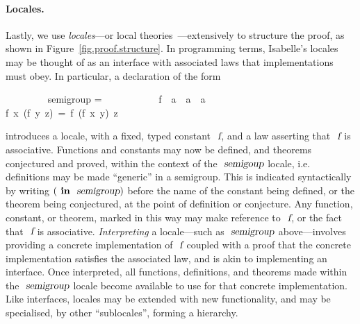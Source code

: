 \paragraph{Locales.}

Lastly, we use \emph{locales}---or local theories~\cite{DBLP:conf/tphol/KammullerWP99,DBLP:conf/types/HaftmannW08}---extensively to structure the proof, as shown in Figure~\ref{fig.proof.structure}.
In programming terms, Isabelle's locales may be thought of as an interface with associated laws that implementations must obey.
In particular, a declaration of the form
\vspace{0.25em}
\begin{isabellebody}
\ \ \ \ \ \ \ \  semigroup = \isanewline
\ \ \ \ \ \ \ \ \ \ \ f\ {\isacharcolon}{\isacharcolon}\ {\isachardoublequoteopen}{\isacharprime}a\ {\isasymRightarrow}\ {\isacharprime}a{\isachardoublequoteclose}\ {\isasymRightarrow}\ {\isacharprime}a{\isachardoublequoteclose} \isanewline
\ \ \ \ \ \ \ \ \ \  {\isachardoublequoteopen}f\ x\ (f\ y\ z)\ =\ f\ (f\ x\ y)\ z{\isachardoublequoteclose}
\end{isabellebody}
\vspace{0.25em}
\noindent
introduces a locale, with a fixed, typed constant $\isa{f}$, and a law asserting that $\isa{f}$ is associative.
Functions and constants may now be defined, and theorems conjectured and proved, within the context of the $\isa{semigoup}$ locale, i.e. definitions may be made ``generic'' in a semigroup.
This is indicated syntactically by writing $(\isacommand{in}\ \isa{semigroup})$ before the name of the constant being defined, or the theorem being conjectured, at the point of definition or conjecture.
Any function, constant, or theorem, marked in this way may make reference to $\isa{f}$, or the fact that $\isa{f}$ is associative.
\emph{Interpreting} a locale---such as $\isa{semigroup}$ above---involves providing a concrete implementation of $\isa{f}$ coupled with a proof that the concrete implementation satisfies the associated law, and is akin to implementing an interface.
Once interpreted, all functions, definitions, and theorems made within the $\isa{semigroup}$ locale become available to use for that concrete implementation.
Like interfaces, locales may be extended with new functionality, and may be specialised, by other ``sublocales'', forming a hierarchy.
